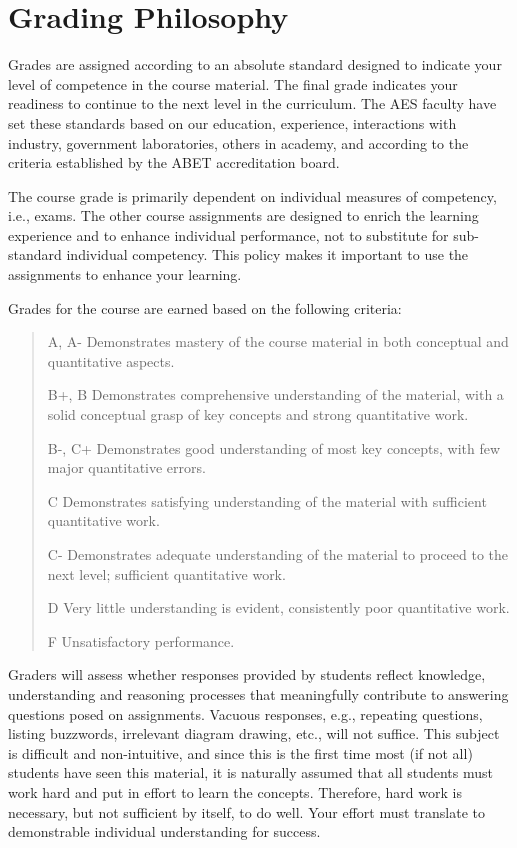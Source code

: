 \documentclass[9pt]{article}
\begin{document}
\section*{Grading Philosophy}

Grades are assigned according to an absolute standard designed to
indicate your level of competence in the course material. The final
grade indicates your readiness to continue to the next level in the
curriculum. {The AES faculty have set these standards based on our
education, experience, interactions with industry, government
laboratories, others in academy, and according to the criteria
established by the ABET accreditation board}.

The course grade is primarily dependent on individual measures of
competency, i.e., exams. The other course assignments are designed to
enrich the learning experience and to enhance individual performance,
not to substitute for sub-standard individual competency. This policy
makes it important to use the assignments to enhance your learning.

Grades for the course are earned based on the following criteria:
\begin{quote}
A, A- Demonstrates mastery of the course material in both conceptual and
quantitative aspects.

B+, B Demonstrates comprehensive understanding of the material, with a
solid conceptual grasp of key concepts and strong quantitative work.

B-, C+ Demonstrates good understanding of most key concepts, with few
major quantitative errors.

C Demonstrates satisfying understanding of the material with sufficient
quantitative work.

C- Demonstrates adequate understanding of the material to proceed to the
next level; sufficient quantitative work.

D Very little understanding is evident, consistently poor quantitative
work.

F Unsatisfactory performance.
\end{quote}

Graders will assess whether responses provided by
students reflect knowledge, understanding and reasoning processes that
{meaningfully contribute} to answering questions posed on assignments.
Vacuous responses, e.g., repeating questions,
listing buzzwords, irrelevant diagram drawing, etc., will not suffice. This subject is difficult and
non-intuitive, and since this is the first time most (if not all)
students have seen this material, it is naturally assumed that all
students must work hard and put in effort to learn the concepts.
Therefore, hard work is necessary, but not sufficient by itself, to do
well. Your effort must translate to demonstrable individual
understanding for success.
\end{document}
